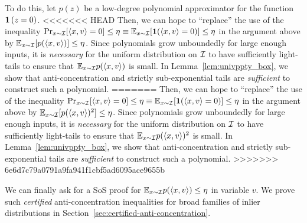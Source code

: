 To do this, let $p(z)$ be a low-degree polynomial approximator for the function $\bm{1}\left( z=0\right)$. 
<<<<<<< HEAD
Then, we can hope to ``replace'' the use of the inequality $\Pr_{x \sim \mathcal I} [\langle x,v\rangle =0] \leq \eta \equiv \mathbb{E}_{x \sim \mathcal I} [\bm{1}(\langle x,v\rangle = 0)] \leq \eta$ in the argument above by $\mathbb{E}_{x \sim \mathcal I}[ p(\langle x,v\rangle)] \leq \eta$. Since polynomials grow unboundedly for large enough inputs, it is \emph{necessary} for the uniform distribution on $\mathcal I$ to have sufficiently light-tails to ensure that $\mathbb{E}_{x \sim \mathcal I} p(\langle x,v\rangle)$ is small. In Lemma~\ref{lem:univppty_box}, we show that anti-concentration and strictly sub-exponential tails are \emph{sufficient} to construct such a polynomial. 
=======
Then, we can hope to ``replace'' the use of the inequality $\Pr_{x \sim \mathcal I} [\langle x,v\rangle =0] \leq \eta \equiv \mathbb{E}_{x \sim \mathcal I} [\bm{1}(\langle x,v\rangle = 0)] \leq \eta$ in the argument above by $\mathbb{E}_{x \sim \mathcal I}[ p(\langle x,v\rangle)^2] \leq \eta$. Since  polynomials grow unboundedly for large enough inputs, it is \emph{necessary} for the uniform distribution on $\mathcal I$ to have sufficiently light-tails to ensure that $\mathbb{E}_{x \sim \mathcal I} p(\langle x,v\rangle)^2$ is small. In Lemma~\ref{lem:univppty_box}, we show that anti-concentration and strictly sub-exponential tails are \emph{sufficient} to construct such a polynomial. 
>>>>>>> 6e6d7c79a0791a9fa941f1cbf5ad6095ace9655b

We can finally ask for a SoS proof for $\mathbb{E}_{x \sim \mathcal I} p(\langle x,v\rangle) \leq \eta$ in variable $v$. We prove such \emph{certified} anti-concentration inequalities for broad families of inlier distributions in Section~\ref{sec:certified-anti-concentration}.



